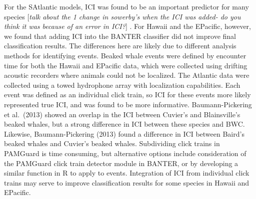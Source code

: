 \documentclass[
  authoryear,
  preprint,
  3p]{elsarticle}
\begin{document}
For the SAtlantic models, ICI was found to be an important predictor for
many species {[}\emph{talk about the 1 change in sowerby's when the ICI
was added- do you think it was because of an error in ICI?}{]} . For
Hawaii and the EPacific, however, we found that adding ICI into the
BANTER classifier did not improve final classification results. The
differences here are likely due to different analysis methods for
identifying events. Beaked whale events were defined by encounter time
for both the Hawaii and EPacific data, which were collected using
drifting acoustic recorders where animals could not be localized. The
Atlantic data were collected using a towed hydrophone array with
localization capabilities. Each event was defined as an individual click
train, so ICI for these events more likely represented true ICI, and was
found to be more informative. Baumann-Pickering et al.~(2013) showed an
overlap in the ICI between Cuvier's and Blainsville's beaked whales, but
a strong difference in ICI between these species and BWC. Likewise,
Baumann-Pickering (2013) found a difference in ICI between Baird's
beaked whales and Cuvier's beaked whales. Subdividing click trains in
PAMGuard is time consuming, but alternative options include
consideration of the PAMGuard click train detector module in BANTER, or
by developing a similar function in R to apply to events. Integration of
ICI from individual click trains may serve to improve classification
results for some species in Hawaii and EPacific.
\end{document}
